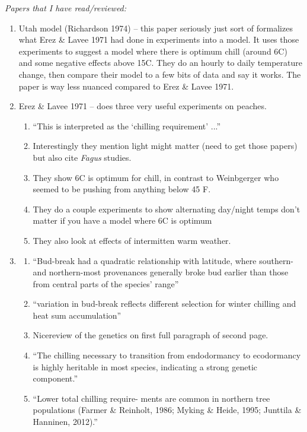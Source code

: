 \documentclass[11pt,letter]{article}
\begin{document}
\emph{Papers that I have read/reviewed:} 

\cite{Maurya2017,McKown2018ecogen,Todesco2020,Azeez2021,Bennett2021,Satake2022}

\begin{enumerate} 
\item Utah model (Richardson 1974) -- this paper seriously just sort of formalizes what Erez \& Lavee 1971 had done in experiments into a model. It uses those experiments to suggest a model where there is optimum chill (around 6C) and some negative effects above 15C. They do an hourly to daily temperature change, then compare their model to a few bits of data and say it works. The paper is way less nuanced compared to  Erez \& Lavee 1971.
\item  Erez \& Lavee 1971 -- does three very useful experiments on peaches. 
\begin{enumerate} 
\item ``This is interpreted as the `chilling requirement' ...''
\item Interestingly they mention light might matter (need to get those papers) but also cite \emph{Fagus} studies. 
\item They show 6C is optimum for chill, in contrast to Weinbgerger who seemed to be pushing from anything below 45 F. 
\item They do a couple experiments to show alternating day/night temps don't matter if you have a model where 6C is optimum
\item They also look at effects of intermitten warm weather. 
\end{enumerate} 
\item \cite{McKown2018ecogen}
\begin{enumerate} 
\item ``Bud-break had a quadratic relationship with latitude, where southern- and northern-most provenances generally broke bud earlier than those from central parts of the species’ range''
\item ``variation in bud-break reflects different selection for winter chilling and heat sum accumulation''
\item Nicereview of the genetics on first full paragraph of second page. 
\item ``The chilling necessary to transition from endodormancy to ecodormancy is highly heritable in most species, indicating a strong genetic component.''
\item ``Lower total chilling require- ments are common in northern tree populations (Farmer \& Reinholt, 1986; Myking \& Heide, 1995; Junttila \& Hanninen, 2012).''

\end{enumerate}
\end{enumerate}
\end{document}
